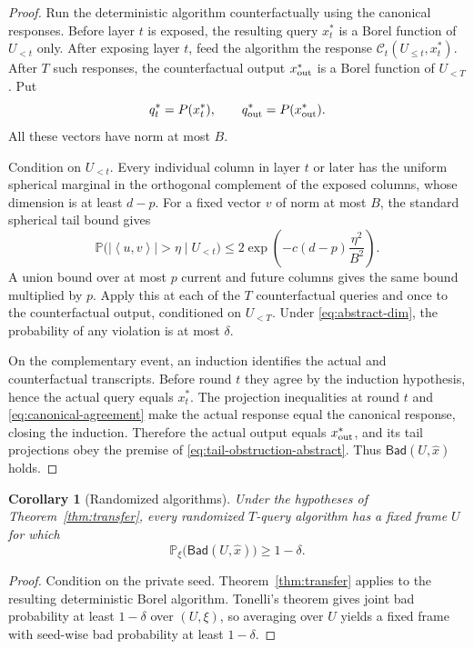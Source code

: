 \documentclass[11pt,a4paper]{article}
\newcommand{\Prob}{\mathbb{P}}
\newcommand{\abs}[1]{\left\lvert #1\right\rvert}
\newcommand{\inner}[2]{\left\langle #1,#2\right\rangle}
\newcommand{\cC}{\mathcal C}
\newtheorem{corollary}[theorem]{Corollary}
\theoremstyle{definition}
\numberwithin{equation}{section}
\begin{document}
\begin{proof}
Run the deterministic algorithm counterfactually using the canonical responses.  Before layer $t$ is exposed, the resulting query $x_t^*$ is a Borel function of $U_{<t}$ only.  After exposing layer $t$, feed the algorithm the response $\cC_t(U_{\le t},x_t^*)$.  After $T$ such responses, the counterfactual output $x_{\rm out}^*$ is a Borel function of $U_{<T}$.  Put
\[
 q_t^*=P(x_t^*),
 \qquad
 q_{\rm out}^*=P(x_{\rm out}^*).
\]
All these vectors have norm at most $B$.

Condition on $U_{<t}$.  Every individual column in layer $t$ or later has the uniform spherical marginal in the orthogonal complement of the exposed columns, whose dimension is at least $d-p$.  For a fixed vector $v$ of norm at most $B$, the standard spherical tail bound gives
\[
 \Prob\bigl(\abs{\inner{u}{v}}>\eta\mid U_{<t}\bigr)
 \le2\exp\left(-c(d-p)\frac{\eta^2}{B^2}\right).
\]
A union bound over at most $p$ current and future columns gives the same bound multiplied by $p$.  Apply this at each of the $T$ counterfactual queries and once to the counterfactual output, conditioned on $U_{<T}$.  Under \eqref{eq:abstract-dim}, the probability of any violation is at most $\delta$.

On the complementary event, an induction identifies the actual and counterfactual transcripts.  Before round $t$ they agree by the induction hypothesis, hence the actual query equals $x_t^*$.  The projection inequalities at round $t$ and \eqref{eq:canonical-agreement} make the actual response equal the canonical response, closing the induction.  Therefore the actual output equals $x_{\rm out}^*$, and its tail projections obey the premise of \eqref{eq:tail-obstruction-abstract}.  Thus $\mathsf{Bad}(U,\widehat x)$ holds.
\end{proof}

\begin{corollary}[Randomized algorithms]\label{cor:transfer-randomized}
Under the hypotheses of Theorem~\ref{thm:transfer}, every randomized $T$-query algorithm has a fixed frame $U$ for which
\[
 \Prob_\xi\bigl(\mathsf{Bad}(U,\widehat x)\bigr)\ge1-\delta.
\]
\end{corollary}

\begin{proof}
Condition on the private seed.  Theorem~\ref{thm:transfer} applies to the resulting deterministic Borel algorithm.  Tonelli's theorem gives joint bad probability at least $1-\delta$ over $(U,\xi)$, so averaging over $U$ yields a fixed frame with seed-wise bad probability at least $1-\delta$.
\end{proof}
\end{document}

